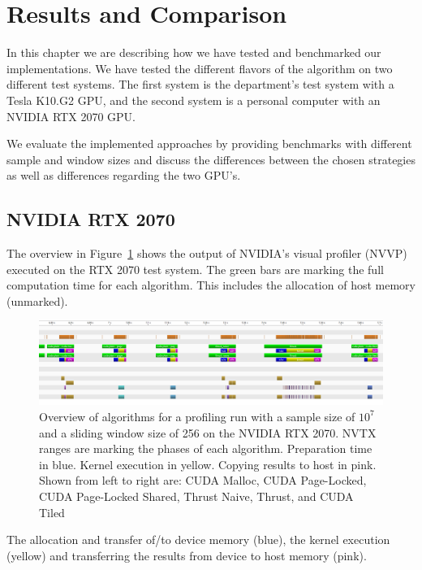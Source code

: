 \section{Results and Comparison}

In this chapter we are describing how we have tested and benchmarked our implementations. We have tested the different flavors of the algorithm on two different test systems. The first system is the department's test system with a Tesla K10.G2 GPU, and the second system is a personal computer with an NVIDIA RTX 2070 GPU.

We evaluate the implemented approaches by providing benchmarks with different sample and window sizes and discuss the differences between the chosen strategies as well as differences regarding the two GPU's.

\subsection{NVIDIA RTX 2070}

The overview in Figure~\ref{fig:group_picture_rtx2070} shows the output of NVIDIA's visual profiler (NVVP) executed on the RTX 2070 test system. The green bars are marking the full computation time for each algorithm. This includes the allocation of host memory (unmarked).

\begin{figure}
    \centering
    \includegraphics[width=1.0\linewidth]{Figures/group_picture_rtx2070}
    \caption{Overview of algorithms for a profiling run with a sample size of $10^7$ and a sliding window size of 256 on the NVIDIA RTX 2070. NVTX ranges are marking the phases of each algorithm. Preparation time in blue. Kernel execution in yellow. Copying results to host in pink. Shown from left to right are: CUDA Malloc, CUDA Page-Locked, CUDA Page-Locked Shared, Thrust Naive, Thrust, and CUDA Tiled}
    \label{fig:group_picture_rtx2070}
\end{figure}

The allocation and transfer of/to device memory (blue), the kernel execution (yellow) and transferring the results from device to host memory (pink).


